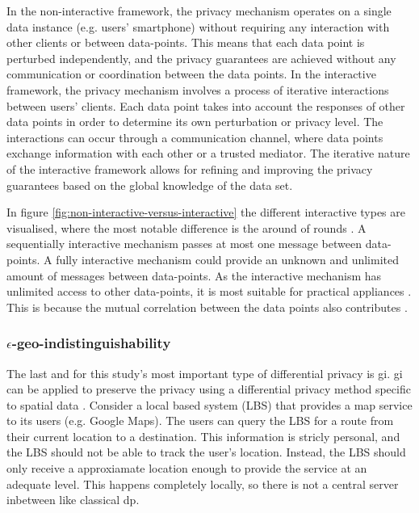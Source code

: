 In the non-interactive framework, the privacy mechanism operates on a single data instance (e.g. users’ smartphone) without requiring any interaction with other clients or between data-points.
This means that each data point is perturbed independently, and the privacy guarantees are achieved without any communication or coordination between the data points.
In the interactive framework, the privacy mechanism involves a process of iterative interactions between users’ clients.
Each data point takes into account the responses of other data points in order to determine its own perturbation or privacy level.
The interactions can occur through a communication channel, where data points exchange information with each other or a trusted mediator.
The iterative nature of the interactive framework allows for refining and improving the privacy guarantees based on the global knowledge of the data set.

In figure \ref{fig:non-interactive-versus-interactive} the different interactive types are visualised, where the most notable difference is the around of rounds \citep{xiongComprehensiveSurveyLocal2020}.
A sequentially interactive mechanism passes at most one message between data-points.
A fully interactive mechanism could provide an unknown and unlimited amount of messages between data-points.
As the interactive mechanism has unlimited access to other data-points, it is most suitable for practical appliances \citep{xiongComprehensiveSurveyLocal2020}.
This is because the mutual correlation between the data points also contributes \citep{wang_comprehensive_2020}.

\subsubsection{$\epsilon$-geo-indistinguishability}
The last and for this study's most important type of differential privacy is \gls{gi}.
\gls{gi} can be applied to preserve the privacy using a differential privacy method specific to spatial data \citep{DBLP:journals/corr/abs-1212-1984}.
Consider a local based system (LBS) that provides a map service to its users (e.g. Google Maps).
The users can query the LBS for a route from their current location to a destination.
This information is stricly personal, and the LBS should not be able to track the user's location.
Instead, the LBS should only receive a approxiamate location enough to provide the service at an adequate level.
This happens completely locally, so there is not a central server inbetween like classical \gls{dp}.

